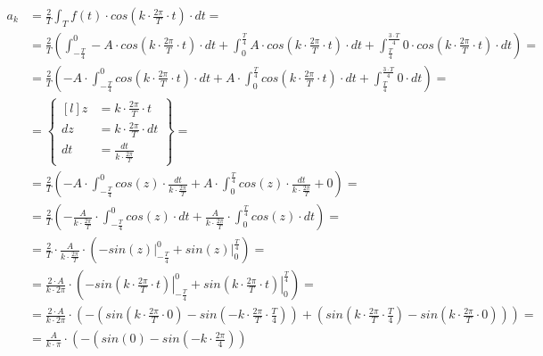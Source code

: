 \begin{task}
\begin{align*}
a_k&=\frac{2}{T}\int_{T}f(t) \cdot cos\left( k \cdot \frac{2\pi}{T} \cdot t\right) \cdot dt=\\
&=\frac{2}{T}\left(\int_{-\frac{T}{4}}^{0} -A \cdot cos\left( k \cdot \frac{2\pi}{T} \cdot t\right) \cdot dt 
+ \int_{0}^{\frac{T}{4}} A \cdot cos\left( k \cdot \frac{2\pi}{T} \cdot t\right) \cdot dt
+ \int_{\frac{T}{4}}^{\frac{3\cdot T}{4}} 0 \cdot cos\left( k \cdot \frac{2\pi}{T} \cdot t\right) \cdot dt \right)=\\
&=\frac{2}{T}\left(-A \cdot \int_{-\frac{T}{4}}^{0} cos\left( k \cdot \frac{2\pi}{T} \cdot t\right) \cdot dt 
+ A \cdot \int_{0}^{\frac{T}{4}} cos\left( k \cdot \frac{2\pi}{T} \cdot t\right) \cdot dt
+ \int_{\frac{T}{4}}^{\frac{3\cdot T}{4}} 0 \cdot dt \right)=\\
&=\begin{Bmatrix*}[l]
z&=k \cdot \frac{2\pi}{T} \cdot t \\
dz&=k \cdot \frac{2\pi}{T} \cdot dt \\
dt&=\frac{dt}{k \cdot \frac{2\pi}{T}}
\end{Bmatrix*} =\\
&=\frac{2}{T}\left(-A \cdot \int_{-\frac{T}{4}}^{0} cos\left( z \right) \cdot \frac{dt}{k \cdot \frac{2\pi}{T}} 
+ A \cdot \int_{0}^{\frac{T}{4}} cos\left( z \right) \cdot \frac{dt}{k \cdot \frac{2\pi}{T}}
+ 0 \right)=\\
&=\frac{2}{T}\left(-\frac{A}{k \cdot \frac{2\pi}{T}} \cdot \int_{-\frac{T}{4}}^{0} cos\left( z \right) \cdot dt 
+ \frac{A}{k \cdot \frac{2\pi}{T}} \cdot \int_{0}^{\frac{T}{4}} cos\left( z \right) \cdot dt\right)=\\
&=\frac{2}{T} \cdot \frac{A}{k \cdot \frac{2\pi}{T}} \cdot \left(- \left. sin\left( z \right) \right|_{-\frac{T}{4}}^{0}
+ \left. sin\left( z \right)\right|_{0}^{\frac{T}{4}} \right)=\\
&=\frac{2 \cdot A}{k \cdot 2\pi} \cdot \left(- \left. sin\left( k \cdot \frac{2\pi}{T} \cdot t  \right) \right|_{-\frac{T}{4}}^{0}
+ \left. sin\left( k \cdot \frac{2\pi}{T} \cdot t  \right)\right|_{0}^{\frac{T}{4}} \right)=\\
&=\frac{2 \cdot A}{k \cdot 2\pi} \cdot \left(- \left( sin\left( k \cdot \frac{2\pi}{T} \cdot 0  \right) - sin\left( - k \cdot \frac{2\pi}{T} \cdot \frac{T}{4}  \right) \right)
+ \left( sin\left( k \cdot \frac{2\pi}{T} \cdot \frac{T}{4}  \right) - sin\left( k \cdot \frac{2\pi}{T} \cdot 0  \right)\right) \right)=\\
&=\frac{A}{k \cdot \pi} \cdot \left(- \left( sin\left( 0 \right) - sin\left( - k \cdot \frac{2\pi}{4} \right) \right)

\end{align*}
\end{task}
